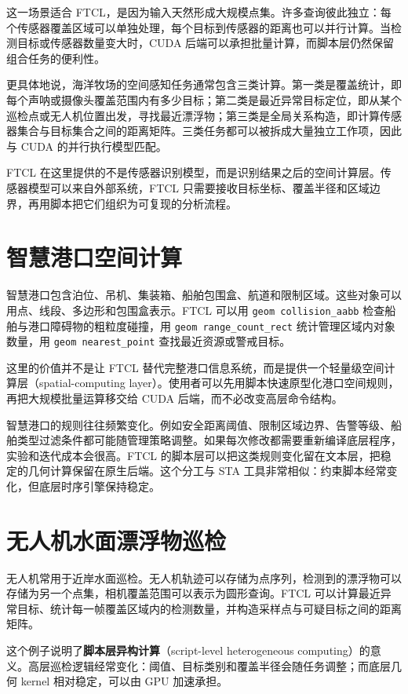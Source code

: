 这一场景适合 FTCL，是因为输入天然形成大规模点集。许多查询彼此独立：每个传感器覆盖区域可以单独处理，每个目标到传感器的距离也可以并行计算。当检测目标或传感器数量变大时，CUDA 后端可以承担批量计算，而脚本层仍然保留组合任务的便利性。

更具体地说，海洋牧场的空间感知任务通常包含三类计算。第一类是覆盖统计，即每个声呐或摄像头覆盖范围内有多少目标；第二类是最近异常目标定位，即从某个巡检点或无人机位置出发，寻找最近漂浮物；第三类是全局关系构造，即计算传感器集合与目标集合之间的距离矩阵。三类任务都可以被拆成大量独立工作项，因此与 CUDA 的并行执行模型匹配。

FTCL 在这里提供的不是传感器识别模型，而是识别结果之后的空间计算层。传感器模型可以来自外部系统，FTCL 只需要接收目标坐标、覆盖半径和区域边界，再用脚本把它们组织为可复现的分析流程。

\section{智慧港口空间计算}
智慧港口包含泊位、吊机、集装箱、船舶包围盒、航道和限制区域。这些对象可以用点、线段、多边形和包围盒表示。FTCL 可以用 \texttt{geom collision\_aabb} 检查船舶与港口障碍物的粗粒度碰撞，用 \texttt{geom range\_count\_rect} 统计管理区域内对象数量，用 \texttt{geom nearest\_point} 查找最近资源或警戒目标。

这里的价值并不是让 FTCL 替代完整港口信息系统，而是提供一个轻量级空间计算层（spatial-computing layer）。使用者可以先用脚本快速原型化港口空间规则，再把大规模批量运算移交给 CUDA 后端，而不必改变高层命令结构。

智慧港口的规则往往频繁变化。例如安全距离阈值、限制区域边界、告警等级、船舶类型过滤条件都可能随管理策略调整。如果每次修改都需要重新编译底层程序，实验和迭代成本会很高。FTCL 的脚本层可以把这类规则变化留在文本层，把稳定的几何计算保留在原生后端。这个分工与 STA 工具非常相似：约束脚本经常变化，但底层时序引擎保持稳定。

\section{无人机水面漂浮物巡检}
无人机常用于近岸水面巡检。无人机轨迹可以存储为点序列，检测到的漂浮物可以存储为另一个点集，相机覆盖范围可以表示为圆形查询。FTCL 可以计算最近异常目标、统计每一帧覆盖区域内的检测数量，并构造采样点与可疑目标之间的距离矩阵。

这个例子说明了\textbf{脚本层异构计算}（script-level heterogeneous computing）的意义。高层巡检逻辑经常变化：阈值、目标类别和覆盖半径会随任务调整；而底层几何 kernel 相对稳定，可以由 GPU 加速承担。

